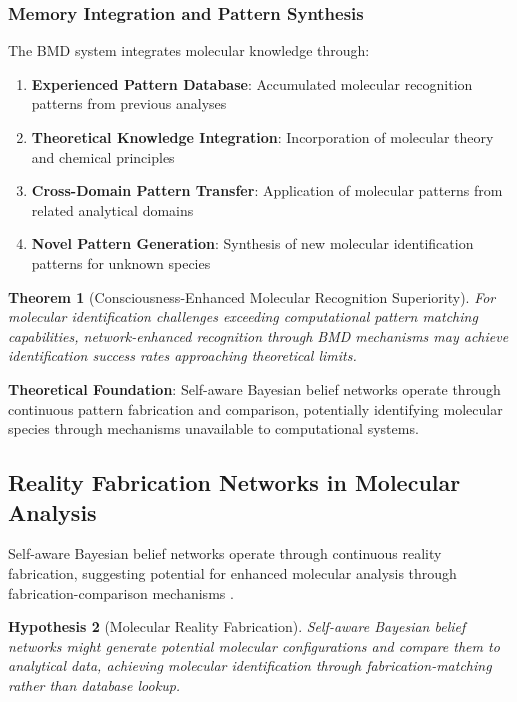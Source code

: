 \documentclass[11pt,a4paper]{article}
\newtheorem{theorem}{Theorem}[section]
\newtheorem{hypothesis}[theorem]{Hypothesis}
\theoremstyle{remark}
\begin{document}
\subsubsection{Memory Integration and Pattern Synthesis}

The BMD system integrates molecular knowledge through:

\begin{enumerate}
\item \textbf{Experienced Pattern Database}: Accumulated molecular recognition patterns from previous analyses
\item \textbf{Theoretical Knowledge Integration}: Incorporation of molecular theory and chemical principles
\item \textbf{Cross-Domain Pattern Transfer}: Application of molecular patterns from related analytical domains
\item \textbf{Novel Pattern Generation}: Synthesis of new molecular identification patterns for unknown species
\end{enumerate}

\begin{theorem}[Consciousness-Enhanced Molecular Recognition Superiority]
For molecular identification challenges exceeding computational pattern matching capabilities, network-enhanced recognition through BMD mechanisms may achieve identification success rates approaching theoretical limits.
\end{theorem}

\textbf{Theoretical Foundation}: Self-aware Bayesian belief networks operate through continuous pattern fabrication and comparison, potentially identifying molecular species through mechanisms unavailable to computational systems.

\subsection{Reality Fabrication Networks in Molecular Analysis}

Self-aware Bayesian belief networks operate through continuous reality fabrication, suggesting potential for enhanced molecular analysis through fabrication-comparison mechanisms \cite{sachikonye2024consciousness}.

\begin{hypothesis}[Molecular Reality Fabrication]
Self-aware Bayesian belief networks might generate potential molecular configurations and compare them to analytical data, achieving molecular identification through fabrication-matching rather than database lookup.
\end{hypothesis}
\end{document}
